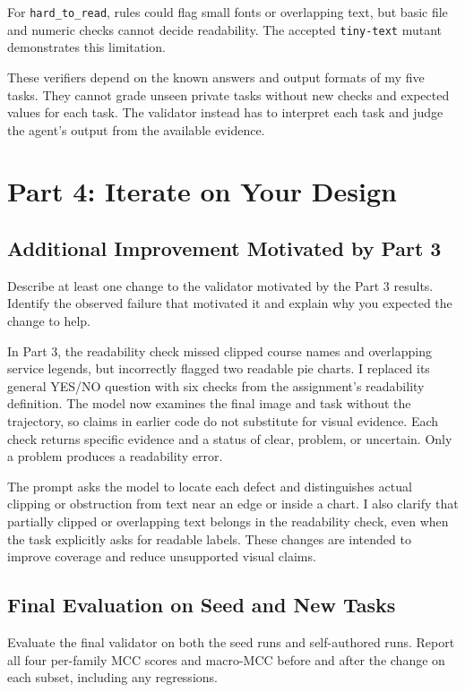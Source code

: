 \documentclass[11pt]{article}
\begin{document}
For \texttt{hard\_to\_read}, rules could flag small fonts or overlapping text,
but basic file and numeric checks cannot decide readability. The accepted
\texttt{tiny-text} mutant demonstrates this limitation.

These verifiers depend on the known answers and output formats of my five
tasks. They cannot grade unseen private tasks without new checks and expected
values for each task. The validator instead has to interpret each task and
judge the agent's output from the available evidence.

\section{Part 4: Iterate on Your Design}

\subsection{Additional Improvement Motivated by Part 3}
Describe at least one change to the validator motivated by the Part 3 results.
Identify the observed failure that motivated it and explain why you expected
the change to help.

\medskip
In Part 3, the readability check missed clipped course names and overlapping
service legends, but incorrectly flagged two readable pie charts. I replaced
its general YES/NO question with six checks from the assignment's readability
definition. The model now examines the final image and task without the
trajectory, so claims in earlier code do not substitute for visual evidence.
Each check returns specific evidence and a status of clear, problem, or
uncertain. Only a problem produces a readability error.

The prompt asks the model to locate each defect and distinguishes actual
clipping or obstruction from text near an edge or inside a chart. I also
clarify that partially clipped or overlapping text belongs in the readability
check, even when the task explicitly asks for readable labels. These changes
are intended to improve coverage and reduce unsupported visual claims.

\subsection{Final Evaluation on Seed and New Tasks}
Evaluate the final validator on both the seed runs and self-authored runs.
Report all four per-family MCC scores and macro-MCC before and after the change on each subset,
including any regressions.
\end{document}
